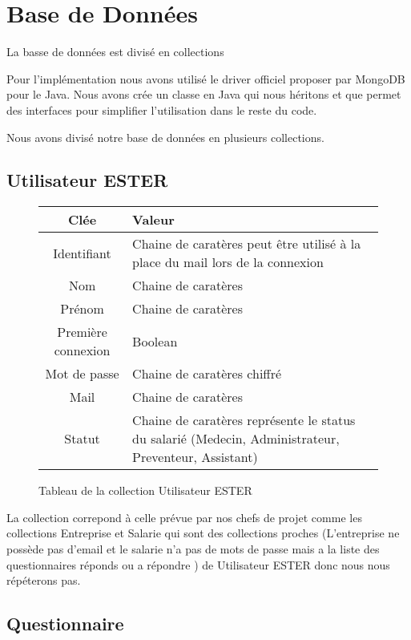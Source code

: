 \section{Base de Données}

La basse de données est divisé en collections 

Pour l'implémentation nous avons utilisé le driver officiel proposer par MongoDB pour le Java. Nous avons crée un classe en Java qui nous héritons et que permet des interfaces pour simplifier l'utilisation dans le reste du code.

Nous avons divisé notre base de données en plusieurs collections. 

\subsection{Utilisateur ESTER}

\begin{figure}[H]
    \begin{center}
        \begin{tabularx}{17cm}{|c|X|}
            \hline
            Clée & Valeur  \tabularnewline 
            \hline
            Identifiant & 
            Chaine de caratères peut être utilisé à la place du mail lors de la connexion \tabularnewline 
            Nom & 
            Chaine de caratères \tabularnewline
            Prénom & 
            Chaine de caratères \tabularnewline
            Première connexion & 
            Boolean \tabularnewline
            Mot de passe & 
            Chaine de caratères chiffré \tabularnewline
            Mail & 
            Chaine de caratères \tabularnewline
            Statut & 
            Chaine de caratères représente le status du salarié (Medecin, Administrateur,
            Preventeur, Assistant) \tabularnewline
            \hline
        \end{tabularx}
    \end{center}
    \caption{Tableau de la collection Utilisateur ESTER}
\end{figure}

La collection correpond à celle prévue par nos chefs de projet comme
les collections Entreprise et Salarie qui sont des collections proches (L'entreprise ne possède 
pas d'email et le salarie n'a pas de mots de passe mais a la liste des questionnaires réponds ou a répondre
) de Utilisateur ESTER donc nous nous répéterons pas. 

\subsection{Questionnaire}

